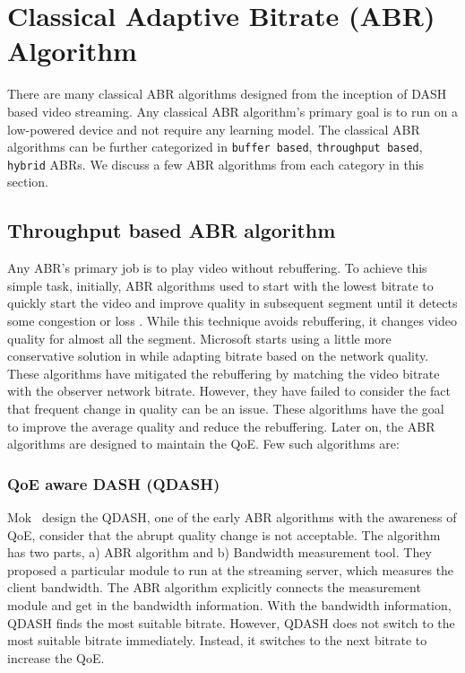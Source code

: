 \section{Classical Adaptive Bitrate (ABR) Algorithm}
There are many classical ABR algorithms designed from the inception of DASH based video streaming. Any classical ABR algorithm's primary goal is to run on a low-powered device and not require any learning model. The classical ABR algorithms can be further categorized in {\tt buffer based}, {\tt throughput based}, {\tt hybrid} ABRs. We discuss a few ABR algorithms from each category in this section.

\subsection{Throughput based ABR algorithm}
Any ABR's primary job is to play video without rebuffering. To achieve this simple task, initially, ABR algorithms used to start with the lowest bitrate to quickly start the video and improve quality in subsequent segment until it detects some congestion or loss \cite{5677508,10.1145/1943552.1943575}. While this technique avoids rebuffering, it changes video quality for almost all the segment. Microsoft starts using a little more conservative solution in \cite{10.1145/1943552.1943574} while adapting bitrate based on the network quality. These algorithms have mitigated the rebuffering by matching the video bitrate with the observer network bitrate. However, they have failed to consider the fact that frequent change in quality can be an issue. These algorithms have the goal to improve the average quality and reduce the rebuffering. Later on, the ABR algorithms are designed to maintain the QoE. Few such algorithms are:

\subsubsection{QoE aware DASH (QDASH)}
Mok \etal\ design the QDASH\cite{10.1145/2155555.2155558}, one of the early ABR algorithms with the awareness of QoE, consider that the abrupt quality change is not acceptable. The algorithm has two parts, a) ABR algorithm and b) Bandwidth measurement tool. They proposed a particular module to run at the streaming server, which measures the client bandwidth. The ABR algorithm explicitly connects the measurement module and get in the bandwidth information. With the bandwidth information, QDASH finds the most suitable bitrate. However, QDASH does not switch to the most suitable bitrate immediately. Instead, it switches to the next bitrate to increase the QoE.


